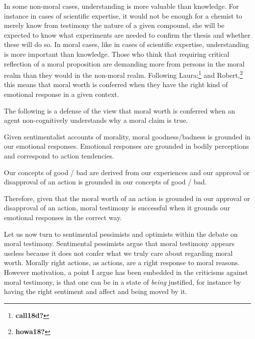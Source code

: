 \documentclass[
  12pt,
]{book}
\newenvironment{Shaded}{\begin{snugshade}}{\end{snugshade}}
\newcommand{\NormalTok}[1]{#1}
\theoremstyle{definition}
\theoremstyle{definition}
\theoremstyle{definition}
\theoremstyle{definition}
\theoremstyle{remark}
\begin{document}
In some non-moral cases, understanding is more valuable than knowledge. For instance in cases of scientific expertise, it would not be enough for a chemist to merely know from testimony the nature of a given compound, she will be expected to know what experiments are needed to confirm the thesis and whether these will do so. In moral cases, like in cases of scientific expertise, understanding is more important than knowledge. Those who think that requiring critical reflection of a moral proposition are demanding more from persons in the moral realm than they would in the non-moral realm. Following Laura;\footnote{\textbf{call18d?}} and Robert,\footnote{\textbf{howa18?}} this means that moral worth is conferred when they have the right kind of emotional response in a given context.

The following is a defense of the view that moral worth is conferred when an agent non-cognitively understands why a moral claim is true.

\begin{Shaded}
\begin{Highlighting}[]

\NormalTok{Given sentimentalist accounts of morality, moral goodness/badness is grounded in our emotional responses. Emotional responses are grounded in bodily perceptions and correspond to action tendencies.}
\end{Highlighting}
\end{Shaded}

\begin{Shaded}
\begin{Highlighting}[]

\NormalTok{Our concepts of good / bad are derived from our experiences and our approval or disapproval of an action is grounded in our concepts of good / bad.}
\end{Highlighting}
\end{Shaded}

\begin{Shaded}
\begin{Highlighting}[]

\NormalTok{Therefore, given that the moral worth of an action is grounded in our approval or disapproval of an action, moral testimony is successful when it grounds our emotional responses in the correct way.}
\end{Highlighting}
\end{Shaded}

Let us now turn to sentimental pessimists and optimists within the debate on moral testimony. Sentimental pessimists argue that moral testimony appears useless because it does not confer what we truly care about regarding moral worth. Morally right actions, as actions, are a right response to moral reasons. However motivation, a point I argue has been embedded in the criticisms against moral testimony, is that one can be in a state of \emph{being} justified, for instance by having the right sentiment and affect and being moved by it.
\end{document}
